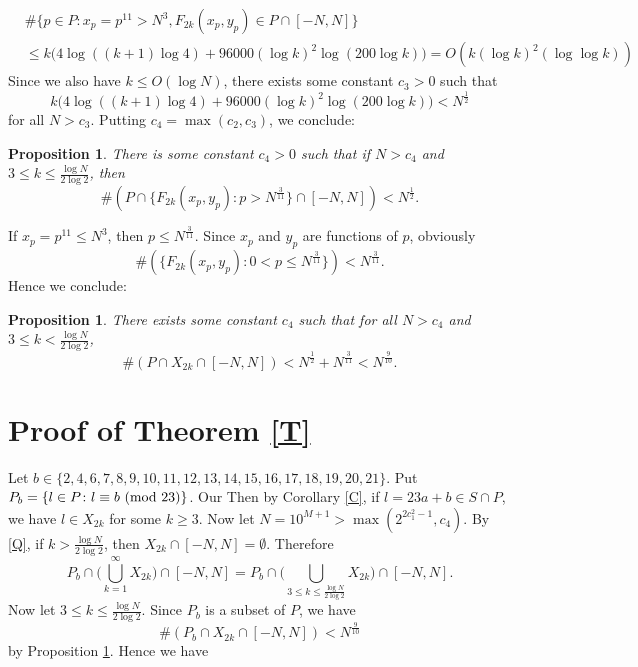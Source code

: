\documentclass[12pt]{amsart}
\newtheorem{prop}[thm]{Proposition}
\numberwithin{equation}{section}
\begin{document}
\begin{align*}
    &  \#\bigg\{p \in P \colon x_p=p^{11}>N^3, F_{2k}(x_p,y_p)\in P\cap[-N,N]\bigg\}\\
    &\leq 
    k\bigg(4\log((k+1)\log 4)+96000(\log k)^2\log(200\log k)\bigg)=O(k(\log k)^2(\log\log k))
\end{align*} 
Since we also have $k\leq O(\log N)$, there exists some constant $c_3>0$ such that $$k\bigg(4\log((k+1)\log 4)+96000(\log k)^2\log(200\log k)\bigg)<N^{\frac{1}{2}}$$ for all $N>c_3$.  Putting $c_4=\max(c_2,c_3)$, we conclude:

\begin{prop}\label{12}
    There is some constant $c_4>0$ such that if $N>c_4$ and $3\leq k \leq \frac{\log N}{2\log 2}$, then 
    $$\# (P\cap \{F_{2k}(x_p,y_p)\colon p>N^{\frac{3}{11}}\}\cap[-N,N]) < N^{\frac{1}{2}}.$$ 
\end{prop}
If $x_p=p^{11}\leq N^3$, then $p\leq N^{\frac{3}{11}}$. Since $x_p$ and $y_p$ are functions of $p$, obviously $$\#(\{F_{2k}(x_p,y_p)\colon 0<p \leq N^{\frac{3}{11}}\}) < N^{\frac{3}{11}}.$$ Hence we conclude: 
\begin{prop}\label{100}
    There exists some constant $c_4$ such that for all $N>c_4$ and $3\leq k<\frac{\log N}{2\log2}$, $$\# (P\cap X_{2k}\cap [-N,N]) < N^{\frac{1}{2}}+N^{\frac{3}{11}} < N^{\frac{9}{10}}.$$
\end{prop}

\section{Proof of Theorem \ref{T}}
Let $b\in\{2,4,6,7,8,9,10,11,12,13,14,15,16,17,18,19,20,21\}$. Put $P_b=\{l\in P\colon l\equiv b\textup{ (mod 23)}\}$.  Our  Then by Corollary \ref{C}, if $l=23a+b\in S\cap P$, we have $l\in X_{2k}$ for some $k\geq 3$. Now let $N=10^{M+1}>\max(2^{2c_1^2-1},c_4)$. By \eqref{Q}, if $k>\frac{\log N}{2\log2}$, then $X_{2k}\cap[-N,N]=\emptyset$. Therefore $$P_b\cap\bigg(\bigcup_{k=1}^\infty X_{2k}\bigg)\cap[-N,N]=P_b\cap\bigg(\bigcup_{3\leq k\leq \frac{\log N}{2\log2}}X_{2k}\bigg)\cap[-N,N].$$Now let $3\leq k\leq \frac{\log N}{2\log 2}$. Since $P_b$ is a subset of $P$, we have $$\# (P_b\cap X_{2k}\cap[-N,N]) < N^{\frac{9}{10}}$$ by Proposition \ref{100}. Hence we have
\end{document}
